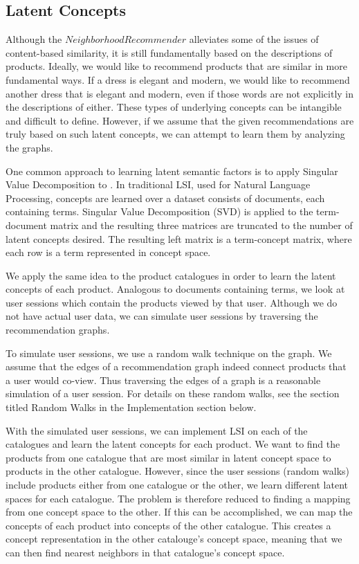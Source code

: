 \documentclass[11pt]{article}
\begin{document}
\subsection*{Latent Concepts}
Although the $Neighborhood Recommender$ alleviates some of the issues of 
content-based similarity, it is still fundamentally based on the descriptions of
products. Ideally, we would like to recommend products that are similar in more
fundamental ways. If a dress is elegant and modern, we would like to recommend 
another dress that is elegant and modern, even if those words are not explicitly
in the descriptions of either. These types of underlying concepts can be 
intangible and difficult to define. However, if we assume that the given
recommendations are truly based on such latent concepts, we can attempt to learn 
them by analyzing the graphs.

One common approach to learning latent semantic factors is to apply Singular Value
Decomposition to . In
traditional LSI, used for Natural Language Processing, concepts are learned over 
a dataset consists of documents, each containing terms. Singular Value 
Decomposition (SVD) is applied to the term-document matrix and the resulting 
three matrices are truncated to the number of latent concepts desired. The 
resulting left matrix is a term-concept matrix, where each row is a term 
represented in concept space.

We apply the same idea to the product catalogues in order to learn the latent
concepts of each product. Analogous to documents containing terms, we look at
user sessions which contain the products viewed by that user. Although we do not
have actual user data, we can simulate user sessions by traversing the
recommendation graphs. 

To simulate user sessions, we use a random walk technique on the graph. We
assume that the edges of a recommendation graph indeed connect products that a user
would co-view. Thus traversing the edges of a graph is a reasonable simulation
of a user session. For details on these random walks, see the section titled
Random Walks in the Implementation section below.

With the simulated user sessions, we can implement LSI on each of the catalogues
and learn the latent concepts for each product. We want to find the products from
one catalogue that are most similar in latent concept space to products in the
other catalogue. However, since the user sessions (random walks) include
products either from one catalogue or the other, we learn different latent 
spaces for each catalogue. The problem is therefore reduced to finding a mapping
from one concept space to the other. If this can be accomplished, we
can map the concepts of each product into concepts of the other catalogue. This
creates a concept representation in the other catalouge's concept space, meaning
that we can then find nearest neighbors in that catalogue's concept space. 
\end{document}
